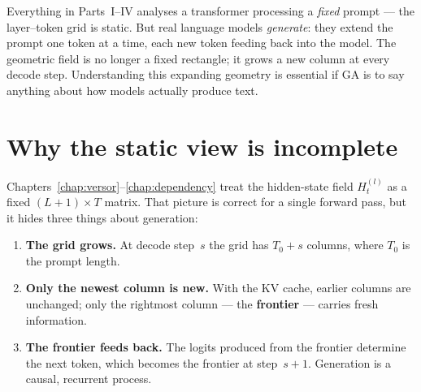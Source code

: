 \documentclass[11pt, twoside, openright]{memoir}
\numberwithin{equation}{chapter}
\begin{document}
\begin{whycare}
Everything in Parts~I--IV analyses a transformer processing a
\emph{fixed} prompt --- the layer--token grid is static.
But real language models \emph{generate}: they extend the prompt one
token at a time, each new token feeding back into the model.
The geometric field is no longer a fixed rectangle; it grows a new
column at every decode step.
Understanding this expanding geometry is essential if GA is to say
anything about how models actually produce text.
\end{whycare}


\section{Why the static view is incomplete}
\label{sec:frontier-static}

Chapters~\ref{chap:versor}--\ref{chap:dependency} treat the
hidden-state field $H^{(l)}_t$ as a fixed $(L+1) \times T$ matrix.
That picture is correct for a single forward pass, but it hides
three things about generation:

\begin{enumerate}[nosep]
\item \textbf{The grid grows.}  At decode step~$s$ the grid has
  $T_0 + s$ columns, where $T_0$ is the prompt length.
\item \textbf{Only the newest column is new.}  With the KV cache,
  earlier columns are unchanged; only the rightmost column ---
  the \textbf{frontier} --- carries fresh information.
\item \textbf{The frontier feeds back.}  The logits produced from
  the frontier determine the next token, which becomes the
  frontier at step~$s+1$.  Generation is a causal, recurrent
  process.
\end{enumerate}
\end{document}
